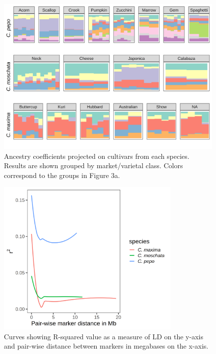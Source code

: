 \documentclass[utf8]{FrontiersinHarvard} %
\begin{document}
\clearpage

\begin{figure}[h]
	\begin{center}
		\includegraphics[width=\textwidth]{../../figures/03_fig.png}
	\end{center}
	\caption{Ancestry coefficients projected on cultivars from each species. Results are shown grouped by market/varietal class. Colors correspond to the groups in Figure 3a. \label{fig:5}}
\end{figure}

\clearpage

\begin{figure}[h]
	\begin{center}
		\includegraphics[width=0.8\textwidth]{../../figures/10_ld_fig.png}
	\end{center}
	\caption{Curves showing R-squared value as a measure of LD on the y-axis and pair-wise distance between markers in megabases on the x-axis. \label{fig:6}}
\end{figure}
\end{document}
